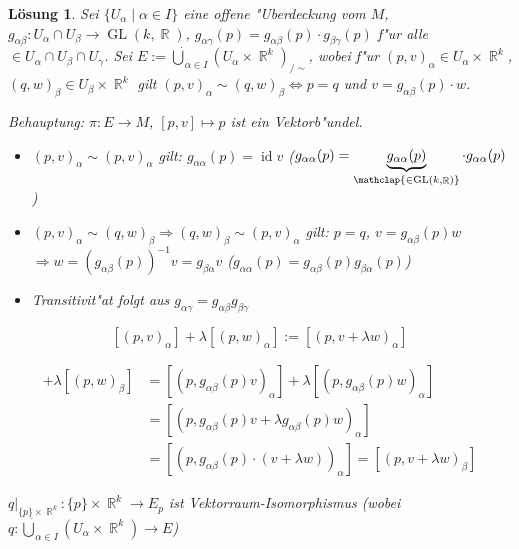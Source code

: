 \documentclass[paper=A4, twoside, chapterprefix=true, bibliography=totoc, headsepline]{scrbook}
\DeclareMathOperator{\R}{\mathbb{R}}
\DeclareMathOperator{\GL}{GL}       %
\DeclareMathOperator{\Id}{id}       %
\newcommand{\X}{\times}
\theoremstyle{plain}
\theoremstyle{nonumberplain}
\theoremstyle{empty}
\theoremstyle{break}
\newtheorem{Loes}{L\"osung}
\newcommand{\quot}[1]{\textrm{\glqq}{#1}\textrm{\grqq}}
\begin{document}
\begin{Loes}
Sei $\{U_\alpha \mid \alpha \in I\}$ eine offene "Uberdeckung vom $M$, $g_{\alpha\beta}: U_\alpha \cap U_\beta \to \GL(k,\R)$, $g_{\alpha\gamma}(p) = g_{\alpha\beta}(p) \cdot g_{\beta\gamma}(p)$ f"ur alle $ \in U_\alpha \cap U_\beta \cap U_\gamma$. Sei $E := \dot\bigcup_{\alpha \in I} (U_\alpha \X \R^k)_{/\sim}$, wobei f"ur $(p,v)_\alpha \in U_\alpha \X \R^k$, $(q,w)_\beta \in U_\beta \X \R^k$ gilt $(p,v)_\alpha \sim (q,w)_\beta \Leftrightarrow p=q$ und $v = g_{\alpha\beta}(p) \cdot w$.

\emph{Behauptung:} $\pi: E \to M$, $[p,v] \mapsto p$ ist ein Vektorb"undel.

\begin{description}[leftmargin=*]
\item[\quot{$\bm{\sim}$} ist "Aquivalenzrelation:]\begin{itemize}[leftmargin=*]
	\item
		$(p,v)_\alpha \sim (p,v)_\alpha$ gilt: $g_{\alpha\alpha}(p) = \Id v$ ($g_{\alpha\alpha}(p) = \underbrace{g_{\alpha\alpha}(p)}_{\mathclap{\in \GL(k,\R)}} \cdot g_{\alpha\alpha}(p)$)
	\item
		$(p,v)_\alpha \sim (q,w)_\beta \Rightarrow (q,w)_\beta \sim (p,v)_\alpha$ gilt: $p=q$, $v=g_{\alpha\beta}(p)w$ $\Rightarrow w = (g_{\alpha\beta}(p))^{-1} v = g_{\beta\alpha} v$ ($g_{\alpha\alpha}(p) = g_{\alpha\beta}(p) g_{\beta\alpha}(p)$)
	\item
		Transitivit"at folgt aus $g_{\alpha\gamma} = g_{\alpha\beta} g_{\beta\gamma}$
	\end{itemize}
\item[$\bm{E_p}$ ist $\bm{k}$-dimensionaler Vektorraum:]
	\[ [(p,v)_\alpha] + \lambda[(p,w)_\alpha] := [(p, v + \lambda w)_\alpha] \]
	\begin{description}[font=\normalfont\itshape,leftmargin=*]
	\item[unabh"angig von $\alpha$:]
		\begin{align*}
			[(p,v)_\beta] + \lambda[(p,w)_\beta] &= [(p,g_{\alpha\beta}(p)v)_\alpha] + \lambda[(p,g_{\alpha\beta}(p)w)_\alpha] \\
				&= [(p,g_{\alpha\beta}(p)v + \lambda g_{\alpha\beta}(p)w)_\alpha] \\
				&= [(p,g_{\alpha\beta}(p) \cdot(v + \lambda w))_\alpha] = [(p,v + \lambda w)_\beta]
		\end{align*}
	\item[$k$-dimensional:]
		$q|_{\{p\} \X \R^k} : \{p\} \X \R^k \to E_p$ ist Vektorraum-Isomorphismus (wobei $q: \dot \bigcup_{\alpha \in I} (U_\alpha \X \R^k) \to E$)

\end{description}
\end{description}
\end{Loes}
\end{document}
